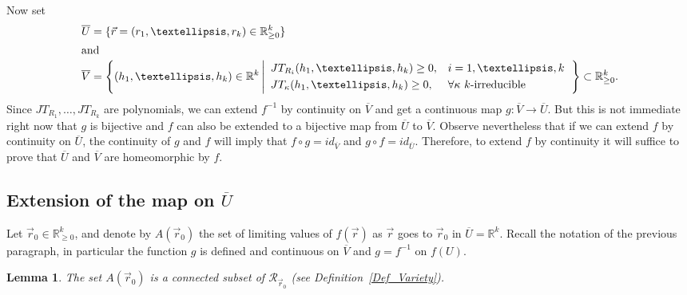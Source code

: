 \documentclass[10pt,a4paper]{amsart}
\newtheorem{lemma}[theorem]{Lemma}
\theoremstyle{definition}
\begin{document}
Now set
\begin{align*}
\overline{U} & =\{\vec{r}=(r_{1},\ldots,r_{k})\in\mathbb{R}_{\geq0}%
^{k}\}\\
\intertext{and }
\overline{V} & =\left\{ (h_{1},\ldots,h_{k})\in\mathbb{R}^{k}%
\left\vert
\begin{array}[c]{ll}
JT_{R_{i}}(h_{1},\ldots,h_{k})\geq0,&i=1,\ldots,k\\[3pt]
JT_{\kappa}(h_{1},\ldots,h_{k})\geq0, &\forall\kappa\text{ }%
k\text{-irreducible}%
\end{array}
\right. 
\right\} \subset\mathbb{R}_{\geq0}^{k}.%
\end{align*}
Since $JT_{R_{1}},\ldots,JT_{R_{k}}$ are polynomials, we can extend $f^{-1}$
by continuity on $\overline{V}$ and get a continuous map $g:\overline
{V}\rightarrow\overline{U}$. But this is not immediate right now that $g$ is
bijective and $f$ can also be extended to a bijective map from $\overline{U}$
to $\overline{V}$. Observe nevertheless that if we can extend $f$ by
continuity on $\overline{U}$, the continuity of $g$ and $f$ will imply that
$f\circ g=id_{\overline{V}}$ and $g\circ f=id_{\overline{U}}.$ Therefore, to
extend $f$ by continuity it will suffice to prove that $\overline{U} $ and
$\overline{V}$ are homeomorphic by $f$.

\subsection{Extension of the map on \texorpdfstring{$\overline{U}$}{U}}

Let $\vec{r}_{0}\in\mathbb{R}_{\geq0}^{k}$, and denote by $A(\vec{r}_{0})$ the
set of limiting values of $f(\vec{r})$ as $\vec{r}$ goes to $\vec{r}_{0}$ in $\overline{U}=\mathbb{R}^{k}$.
Recall the notation of the previous paragraph, in particular the function $g$
is defined and continuous on $\overline{V}$ and $g=f^{-1}$ on $f(U)$.

\begin{lemma}
The set $A(\vec{r}_{0})$ is a connected subset of $\mathcal{R}_{\vec{r}_{0}}$
(see Definition~\ref{Def_Variety}).
\end{lemma}
\end{document}
